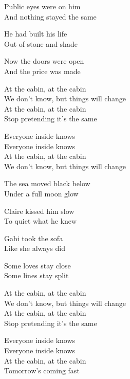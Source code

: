 \begin{lyrics}
Public eyes were on him\\
And nothing stayed the same

He had built his life\\
Out of stone and shade

Now the doors were open\\
And the price was made

At the cabin, at the cabin\\
We don’t know, but things will change\\
At the cabin, at the cabin\\
Stop pretending it’s the same

Everyone inside knows\\
Everyone inside knows\\
At the cabin, at the cabin\\
We don’t know, but things will change

The sea moved black below\\
Under a full moon glow

Claire kissed him slow\\
To quiet what he knew

Gabi took the sofa\\
Like she always did

Some loves stay close\\
Some lines stay split

At the cabin, at the cabin\\
We don’t know, but things will change\\
At the cabin, at the cabin\\
Stop pretending it’s the same

Everyone inside knows\\
Everyone inside knows\\
At the cabin, at the cabin\\
Tomorrow’s coming fast
\end{lyrics}
